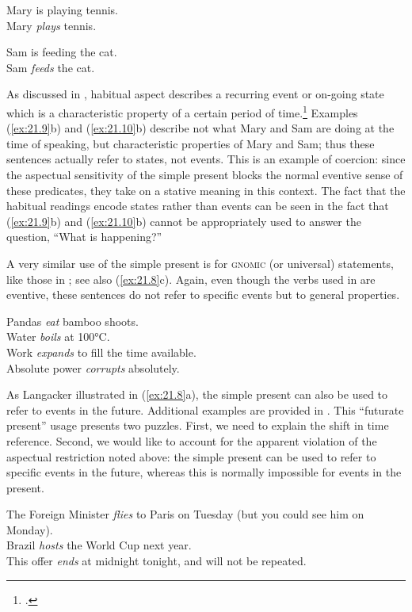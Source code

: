 \ea \label{ex:21.9}
\ea  Mary is playing tennis.\\
\ex Mary \textit{plays} tennis.
                       \z
\z

\ea \label{ex:21.10}
\ea  Sam is feeding the cat.\\
\ex Sam \textit{feeds} the cat.
                       \z
\z

As discussed in , habitual aspect describes a recurring event or on-going state which is a characteristic property of a certain period of time.\footnote{\citet[27--28]{Comrie1976}.} Examples (\ref{ex:21.9}b) and (\ref{ex:21.10}b) describe not what Mary and Sam are doing at the time of speaking, but characteristic properties of Mary and Sam; thus these sentences actually refer to states, not events. This is an example of coercion: since the aspectual sensitivity of the simple present blocks the normal eventive sense of these predicates, they take on a stative meaning in this context. The fact that the habitual readings encode states rather than events can be seen in the fact that (\ref{ex:21.9}b) and (\ref{ex:21.10}b) cannot be appropriately used to answer the question, “What is happening?”


A very similar use of the simple present is for \textsc{gnomic} (or universal) statements, like those in ; see also (\ref{ex:21.8}c). Again, even though the verbs used in  are eventive, these sentences do not refer to specific events but to general properties.


\ea \label{ex:21.11}
\ea  Pandas \textit{eat} bamboo shoots.\\
\ex Water \textit{boils} at 100°C.\\
\ex Work \textit{expands} to fill the time available.\\
\ex Absolute power \textit{corrupts} absolutely.
                       \z
\z

As Langacker illustrated in (\ref{ex:21.8}a), the simple present can also be used to refer to events in the future. Additional examples are provided in . This “futurate present” usage presents two puzzles. First, we need to explain the shift in time reference. Second, we would like to account for the apparent violation of the aspectual restriction noted above: the simple present can be used to refer to specific events in the future, whereas this is normally impossible for events in the present.

\ea \label{ex:21.12}
\ea  The Foreign Minister \textit{flies} to Paris on Tuesday (but you could see him on Monday).\\
\ex Brazil \textit{hosts} the World Cup next year.\\
\ex This offer \textit{ends} at midnight tonight, and will not be repeated.
                       \z
\z

